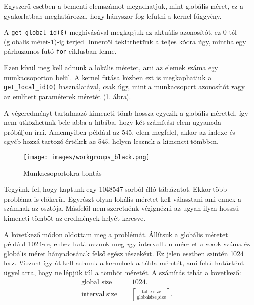 
Egyszerű esetben a bementi elemszámot megadhatjuk, mint globális méret, ez a gyakorlatban meghatározza, hogy hányszor fog lefutni a kernel függvény.

A \texttt{get\_global\_id(0)} meghívásával megkapjuk az aktuális azonosítót, ez 0-tól (globális méret-1)-ig terjed. Innentől tekinthetünk a teljes kódra úgy, mintha egy párhuzamos futó \texttt{for} ciklusban lenne.

Ezen kívül meg kell adnunk a lokális méretet, ami az elemek száma egy munkacsoporton belül. A kernel futása közben ezt is megkaphatjuk a \texttt{get\_local\_id(0)} használatával, csak úgy, mint a munkacsoport azonosítót vagy az említett paraméterek méretét (\ref{fig:workgroups_black}. ábra).

A végeredményt tartalmazó kimeneti tömb hossza egyezik a globális mérettel, így nem ütközhetünk bele abba a hibába, hogy két számítási elem ugyanoda próbáljon írni. Amennyiben például az 545. elem megfelel, akkor az indexe és egyéb hozzá tartozó értékek az 545. helyen lesznek a kimeneti tömbben.

\begin{figure}[h!]
\centering
\texttt{[image: images/workgroups\_black.png]}
\caption{Munkacsoportokra bontás}
\label{fig:workgroups_black}
\end{figure}

\newpage


Tegyünk fel, hogy kaptunk egy 1048547 sorból álló táblázatot. Ekkor több probléma is előkerül. Egyrészt olyan lokális méretet kell választani ami ennek a számnak az osztója. Másfelől nem szeretnénk végignézni az ugyan ilyen hosszú kimeneti tömböt az eredmények helyét keresve.

A következő módon oldottam meg a problémát. Állítsuk a globális méretet például 1024-re, ehhez határozzunk meg egy intervallum méretet a sorok száma és globális méret hányadosának felső egész részeként. Ez jelen esetben szintén 1024 lesz. Viszont így át kell adnunk a kernelnek a tábla méretét, ami felső határként ügyel arra, hogy ne lépjük túl a tömböt méretét. A számítás tehát a következő:
\begin{align*}
\text{global\_size} &= 1024, \\
\text{interval\_size} &=
\left\lceil \frac{\text{table\_size}}{\text{globalsize\_size}} \right\rceil.
\end{align*}

